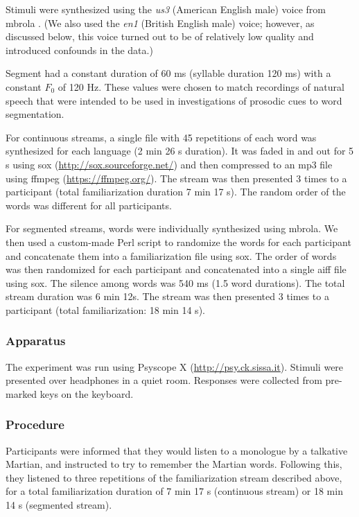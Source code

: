 \documentclass[
]{article}
\begin{document}
Stimuli were synthesized using the \emph{us3} (American English male)
voice from mbrola \citep{mbrola}. (We also used the \emph{en1} (British
English male) voice; however, as discussed below, this voice turned out
to be of relatively low quality and introduced confounds in the data.)

Segment had a constant duration of 60 ms (syllable duration 120 ms) with
a constant \(F_0\) of 120 Hz. These values were chosen to match
recordings of natural speech that were intended to be used in
investigations of prosodic cues to word segmentation.

For continuous streams, a single file with 45 repetitions of each word
was synthesized for each language (2 min 26 s duration). It was faded in
and out for 5 s using sox (\url{http://sox.sourceforge.net/}) and then
compressed to an mp3 file using ffmpeg (\url{https://ffmpeg.org/}). The
stream was then presented 3 times to a participant (total
familiarization duration 7 min 17 s). The random order of the words was
different for all participants.

For segmented streams, words were individually synthesized using mbrola.
We then used a custom-made Perl script to randomize the words for each
participant and concatenate them into a familiarization file using sox.
The order of words was then randomized for each participant and
concatenated into a single aiff file using sox. The silence among words
was 540 ms (1.5 word durations). The total stream duration was 6 min
12s. The stream was then presented 3 times to a participant (total
familiarization: 18 min 14 s).

\hypertarget{apparatus}{%
\subsubsection{Apparatus}\label{apparatus}}

The experiment was run using Psyscope X (\url{http://psy.ck.sissa.it}).
Stimuli were presented over headphones in a quiet room. Responses were
collected from pre-marked keys on the keyboard.

\hypertarget{procedure}{%
\subsubsection{Procedure}\label{procedure}}

Participants were informed that they would listen to a monologue by a
talkative Martian, and instructed to try to remember the Martian words.
Following this, they listened to three repetitions of the
familiarization stream described above, for a total familiarization
duration of 7 min 17 s (continuous stream) or 18 min 14 s (segmented
stream).
\end{document}
